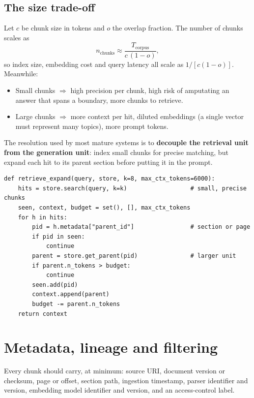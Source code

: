 \documentclass[11pt,twoside,openright]{book}
\theoremstyle{definition}
\theoremstyle{plain}
\theoremstyle{remark}
\newcommand{\term}[1]{\textbf{#1}}
\begin{document}
\subsection{The size trade-off}

Let $c$ be chunk size in tokens and $o$ the overlap fraction. The number of
chunks scales as
\[
  n_{\text{chunks}} \approx \frac{T_{\text{corpus}}}{c\,(1-o)} ,
\]
so index size, embedding cost and query latency all scale as $1/[c(1-o)]$.
Meanwhile:

\begin{itemize}[leftmargin=1.4em]
  \item Small chunks $\Rightarrow$ high precision per chunk, high risk of
        amputating an answer that spans a boundary, more chunks to retrieve.
  \item Large chunks $\Rightarrow$ more context per hit, diluted embeddings
        (a single vector must represent many topics), more prompt tokens.
\end{itemize}

The resolution used by most mature systems is to \term{decouple the retrieval
unit from the generation unit}: index small chunks for precise matching, but
expand each hit to its parent section before putting it in the prompt.

\begin{lstlisting}[style=py, caption={Small-to-big retrieval: match precisely,
generate on context.}]
def retrieve_expand(query, store, k=8, max_ctx_tokens=6000):
    hits = store.search(query, k=k)                  # small, precise chunks
    seen, context, budget = set(), [], max_ctx_tokens
    for h in hits:
        pid = h.metadata["parent_id"]                # section or page
        if pid in seen:
            continue
        parent = store.get_parent(pid)               # larger unit
        if parent.n_tokens > budget:
            continue
        seen.add(pid)
        context.append(parent)
        budget -= parent.n_tokens
    return context
\end{lstlisting}

\section{Metadata, lineage and filtering}

Every chunk should carry, at minimum: source URI, document version or checksum,
page or offset, section path, ingestion timestamp, parser identifier and
version, embedding model identifier and version, and an access-control label.
\end{document}
